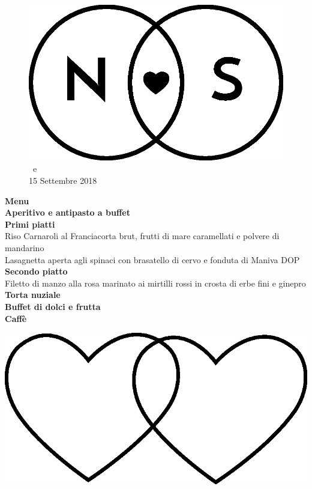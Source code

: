 \documentclass[11pt]{book}
\begin{document}
\begin{center}
\begin{figure}
\centering
\includegraphics[scale=0.23]{img/Logo_piccolo.eps}
\vfill
\LARGE\NSposo \ e \NSposa\\
\small15 Settembre 2018\\
\end{figure}
\vfill
\Huge \textbf{Menu}\\
\hfill\break
\normalsize\textbf{Aperitivo e antipasto a buffet}\\
\hfill\break
\textbf{Primi piatti}\\
Riso Carnaroli al Franciacorta brut, frutti di mare caramellati e polvere di mandarino\\
\hfill\break
Lasagnetta aperta agli spinaci con brasatello di cervo e fonduta di Maniva DOP\\
\hfill\break
\textbf{Secondo piatto}\\
Filetto di manzo alla rosa marinato ai mirtilli rossi in crosta di erbe fini e ginepro\\
\hfill\break
\textbf{Torta nuziale}\\
\textbf{Buffet di dolci e frutta}\\
\textbf{Caffè}\\

\vfill

\begin{center}
\includegraphics[scale=0.1]{img/cuori_venn.eps}
\end{center}

\vfill

\end{center}
\end{document}
